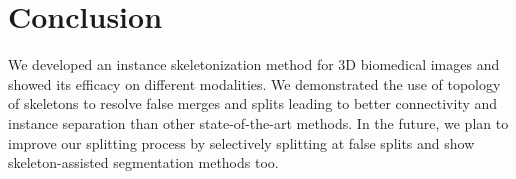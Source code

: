 
\chapter{Conclusion}\label{chapter:conclusion}

We developed an instance skeletonization method for 3D biomedical images and showed its efficacy on different modalities. We demonstrated the use of topology of skeletons to resolve false merges and splits leading to better connectivity and instance separation than other state-of-the-art methods. In the future, we plan to improve our splitting process by selectively splitting at false splits and show skeleton-assisted segmentation methods too.
